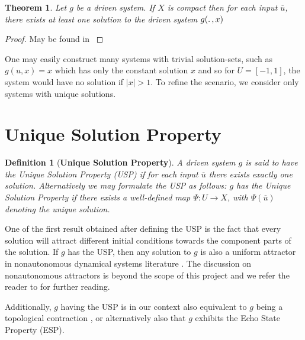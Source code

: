 \documentclass[a4paper,12pt,twoside]{report}
\newtheorem{Definition}{Definition}[]
\newtheorem{Theorem}{Theorem}[]
\begin{document}
\begin{Theorem}\label{Thm_CompactExistence}
 Let $g$ be a driven system.  If $X$ is compact then for each input $\overline{u}$, there exists at least one solution to the driven system $g(\ldotp, x)$
\end{Theorem}
\begin{proof}
  May be found in \cite{kloeden2011nonautonomous, manjunath2014dynamics, manjunath2013echo}
\end{proof}

One may easily construct many systems with trivial solution-sets, such as $g(u,x)=x$ which has only the constant solution $x$ and so for $U=[-1,1]$, the system would have no solution if $|x|>1$. To refine the scenario, we consider only systems with unique solutions. 

\section {Unique Solution Property}

\begin{Definition}
  [\bf Unique Solution Property] \label{Dfn_usp}\rm
  A driven system $g$ is said to have the Unique Solution Property (USP) if for each input $\overline{u}$ there exists exactly one solution. 
  Alternatively we may formulate the USP as follows: $g$ has the Unique Solution Property if there exists a well-defined map $\Psi:{U}\to{X}$, with $\Psi({\overline{u}})$ denoting the unique solution.
\end{Definition}

One of the first result obtained after defining the USP is the fact that every solution will attract different initial conditions towards the component parts of the solution. %
If $g$ has the USP, then any solution to $g$ is also a uniform attractor in nonautonomous dynamical systems literature \cite{Manju_Nonlinearity}. The discussion on nonautonomous attractors is beyond the scope of this project and we refer the reader to \cite{Manju_ESP, esann2012ids} for further reading. 

Additionally, $g$ having the USP is in our context also equivalent to $g$ being a topological contraction \cite{manjunath2021universal}, or alternatively also that $g$ exhibits the Echo State Property (ESP). 
\end{document}
